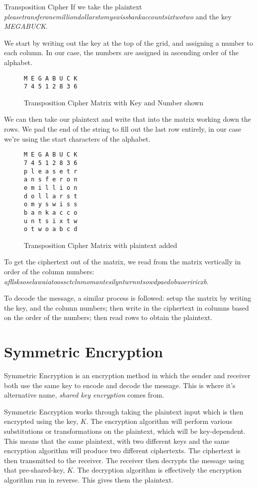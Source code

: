 \begin{example}{Transposition Cipher}
If we take the plaintext \textit{pleasetransferonemilliondollarstomyswissbankaccountsixtwotwo} and the key \textit{MEGABUCK}. 

We start by writing out the key at the top of the grid, and assigning a number to each column. In our case, the numbers are assigned in ascending order of the alphabet.

\begin{figure}[H]
\centering
\begin{BVerbatim}
M E G A B U C K
7 4 5 1 2 8 3 6
\end{BVerbatim}
\caption{Transposition Cipher Matrix with Key and Number shown}
\end{figure}

We can then take our plaintext and write that into the matrix working down the rows. We pad the end of the string to fill out the last row entirely, in our case we're using the start characters of the alphabet.

\begin{figure}[H]
\centering
\begin{BVerbatim}
M E G A B U C K
7 4 5 1 2 8 3 6
p l e a s e t r
a n s f e r o n
e m i l l i o n
d o l l a r s t
o m y s w i s s
b a n k a c c o
u n t s i x t w
o t w o a b c d
\end{BVerbatim}
\caption{Transposition Cipher Matrix with plaintext added}
\end{figure}

To get the ciphertext out of the matrix, we read from the matrix vertically in order of the column numbers: \textit{afllsksoselawaiatoossctclnmomantesilyntwrnntsowdpaedobuoeriricxb}. 

To decode the message, a similar process is followed: setup the matrix by writing the key, and the column numbers; then write in the ciphertext in columns based on the order of the numbers; then read rows to obtain the plaintext.
\end{example}

\section{Symmetric Encryption}
Symmetric Encryption is an encryption method in which the sender and receiver both use the same key to encode and decode the message. This is where it's alternative name, \textit{shared key encryption} comes from. 

Symmetric Encryption works through taking the plaintext input which is then encrypted using the key, $K$. The encryption algorithm will perform various substitutions or transformations on the plaintext, which will be key-dependent. This means that the same plaintext, with two different keys and the same encryption algorithm will produce two different ciphertexts. The ciphertext is then transmitted to the receiver. The receiver then decrypts the message using that pre-shared-key, $K$. The decryption algorithm is effectively the encryption algorithm run in reverse. This gives them the plaintext. 

